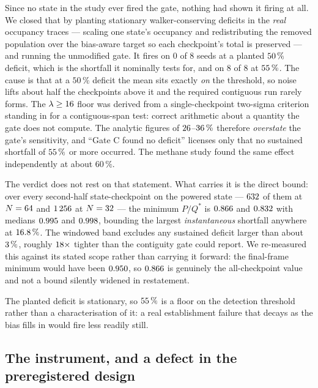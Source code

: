 \begin{remark}
\label{rem:nacl_gatec}
Since no state in the study ever fired the gate, nothing had shown it firing at all. We closed
that by planting stationary walker-conserving deficits in the \emph{real} occupancy traces ---
scaling one state's occupancy and redistributing the removed population over the bias-aware
target so each checkpoint's total is preserved --- and running the unmodified gate. It fires on
$0$ of $8$ seeds at a planted $50\,\%$ deficit, which is the shortfall it nominally
tests for, and on $8$ of $8$ at $55\,\%$. The cause is that at a $50\,\%$ deficit the
mean sits exactly \emph{on} the threshold, so noise lifts about half the checkpoints above it and
the required contiguous run rarely forms. The $\lambda \geq 16$ floor was derived from a
single-checkpoint two-sigma criterion standing in for a contiguous-span test: correct arithmetic
about a quantity the gate does not compute. The analytic figures of
$26$--$36\,\%$ therefore \emph{overstate} the gate's sensitivity, and
``Gate C found no deficit'' licenses only that no sustained shortfall of $55\,\%$ or
more occurred. The methane study found the same effect independently at about $60\,\%$.

The verdict does not rest on that statement. What carries it is the direct bound: over every
second-half state-checkpoint on the powered state --- $632$ of them at $N = 64$
and $1\,256$ at $N = 32$ --- the minimum $P/Q^*$ is $0.866$ and $0.832$
with medians $0.995$ and $0.998$, bounding the largest \emph{instantaneous}
shortfall anywhere at $16.8\,\%$. The windowed band excludes any sustained deficit
larger than about $3\,\%$, roughly $18\times$ tighter than the
contiguity gate could report. We re-measured this against its stated scope rather than carrying
it forward: the final-frame minimum would have been $0.950$, so $0.866$ is
genuinely the all-checkpoint value and not a bound silently widened in restatement.
\end{remark}

The planted deficit is stationary, so $55\,\%$ is a floor on the detection threshold
rather than a characterisation of it: a real establishment failure that decays as the bias fills
in would fire less readily still.

\subsection{The instrument, and a defect in the preregistered design}
\label{sec:nacl_instrument}


